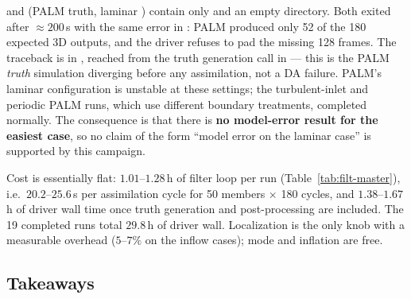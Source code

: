  and  (PALM truth, laminar ) contain only
 and an empty  directory. Both exited
 after $\approx 200$\,s with the same error in :
PALM produced only 52 of the 180 expected 3D outputs, and the driver refuses to
pad the missing 128 frames. The traceback is in
, reached from the truth
generation call in  --- this is the PALM \emph{truth}
simulation diverging before any assimilation, not a DA failure. PALM's laminar
 configuration is unstable at these settings; the
turbulent-inlet and periodic PALM runs, which use different boundary
treatments, completed normally. The consequence is that there is \textbf{no
model-error result for the easiest case}, so no claim of the form ``model error
on the laminar case'' is supported by this campaign.

Cost is essentially flat: $1.01$--$1.28$\,h of filter loop per run
(Table~\ref{tab:filt-master}), i.e.\ $20.2$--$25.6$\,s per assimilation cycle
for 50 members $\times$ 180 cycles, and $1.38$--$1.67$\,h of driver wall time
once truth generation and post-processing are included. The 19 completed runs
total $29.8$\,h of driver wall. Localization is the only knob with a measurable
overhead ($5$--$7\%$ on the inflow cases); mode and inflation are free.

\subsection{Takeaways}
\label{sec:filt-takeaways}

